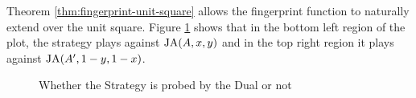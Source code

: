 Theorem \ref{thm:fingerprint-unit-square} allows the fingerprint function to naturally extend over the unit square.
Figure \ref{fig:DualProbe} shows that in the \textcolor{sol-violet}{bottom left} region of the plot, the strategy plays against $\text{JA}(A, x, y)$ and in the \textcolor{sol-cyan}{top right} region it plays against $\text{JA}(A', 1-y, 1-x)$.

\begin{figure}[!hbtp]
    \begin{center}
        
        \caption{Whether the Strategy is probed by the Dual or not}\label{fig:DualProbe}
    \end{center}
\end{figure}




\solarizedPalette


